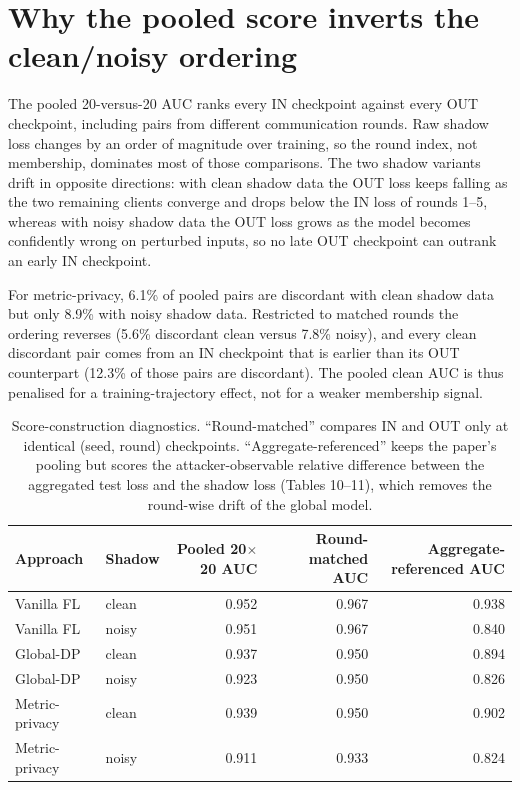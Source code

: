 \documentclass[10pt]{article}
\begin{document}
\clearpage
\section*{Why the pooled score inverts the clean/noisy ordering}
The pooled 20-versus-20 AUC ranks every IN checkpoint against every OUT checkpoint, including pairs from
different communication rounds. Raw shadow loss changes by an order of magnitude over training, so the round
index, not membership, dominates most of those comparisons. The two shadow variants drift in opposite
directions: with clean shadow data the OUT loss keeps falling as the two remaining clients converge and drops
below the IN loss of rounds 1--5, whereas with noisy shadow data the OUT loss grows as the model becomes
confidently wrong on perturbed inputs, so no late OUT checkpoint can outrank an early IN checkpoint.

For metric-privacy, 6.1\% of pooled pairs are discordant with clean shadow data but only
8.9\% with noisy shadow data. Restricted to matched rounds the ordering reverses
(5.6\% discordant clean versus 7.8\% noisy), and
every clean discordant pair comes from an IN checkpoint that is earlier than its OUT counterpart
(12.3\% of those pairs are discordant). The pooled clean AUC is thus penalised for a
training-trajectory effect, not for a weaker membership signal.

\begin{table}[h]
\centering
\caption{Score-construction diagnostics. ``Round-matched'' compares IN and OUT only at identical
(seed, round) checkpoints. ``Aggregate-referenced'' keeps the paper's pooling but scores the
attacker-observable relative difference between the aggregated test loss and the shadow loss
(Tables 10--11), which removes the round-wise drift of the global model.}
\begin{tabular}{llrrr}
\toprule
Approach & Shadow & Pooled 20$\times$20 AUC & Round-matched AUC & Aggregate-referenced AUC \\
\midrule
Vanilla FL & clean & 0.952 & 0.967 & 0.938 \\
Vanilla FL & noisy & 0.951 & 0.967 & 0.840 \\
\midrule
Global-DP & clean & 0.937 & 0.950 & 0.894 \\
Global-DP & noisy & 0.923 & 0.950 & 0.826 \\
\midrule
Metric-privacy & clean & 0.939 & 0.950 & 0.902 \\
Metric-privacy & noisy & 0.911 & 0.933 & 0.824 \\
\bottomrule
\end{tabular}
\end{table}
\end{document}
